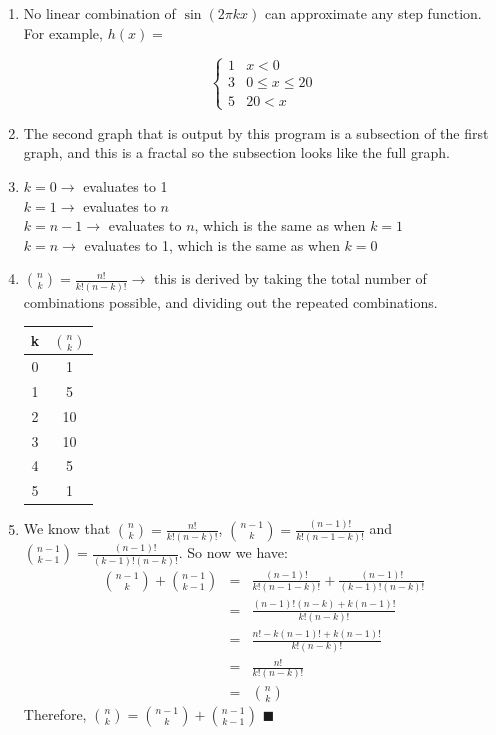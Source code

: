 \documentclass{article}
\newcommand*{\qed}{\hfill\ensuremath{\blacksquare}}
\begin{document}
\begin{enumerate}
\item No linear combination of $\sin{(2\pi kx)}$ can approximate any step function. For example, $h(x) = $

\[
\begin{cases} 
      1 & x< 0 \\
      3 & 0\leq x\leq 20 \\
      5 & 20< x 
\end{cases}
\]

\item The second graph that is output by this program is a subsection of the first graph, and this is a fractal so the subsection looks like the full graph.

\item $k=0 \rightarrow$ evaluates to 1\\
$k=1 \rightarrow$ evaluates to $n$\\
$k=n-1 \rightarrow$ evaluates to $n$, which is the same as when $k=1$\\
$k=n \rightarrow$ evaluates to 1, which is the same as when $k=0$

\item ${n\choose k} = \frac{n!}{k! (n-k)!} \rightarrow$ this is derived by taking the total number of combinations possible, and dividing out the repeated combinations.\\
\begin{tabular}{|c|c|}
	\hline
	k	& ${n\choose k}$\\
	\hline
	0	& 1\\
	\hline
	1	& 5\\
	\hline
	2	& 10\\
	\hline
	3	& 10\\
	\hline
	4	& 5\\
	\hline
	5	& 1\\
	\hline
\end{tabular}

\item We know that ${n\choose k} = \frac{n!}{k!(n-k)!}$, ${n-1\choose k} = \frac{(n-1)!}{k!(n-1-k)!}$ and ${n-1\choose k-1} = \frac{(n-1)!}{(k-1)!(n-k)!}$. So now we have:
\begin{eqnarray*}
	{n-1\choose k} + {n-1\choose k-1} &=& \frac{(n-1)!}{k!(n-1-k)!} + \frac{(n-1)!}{(k-1)!(n-k)!}\\
	&=& \frac{(n-1)!(n-k) + k(n-1)!}{k!(n-k)!}\\
	&=& \frac{n! - k(n-1)! + k(n-1)!}{k!(n-k)!}\\
	&=& \frac{n!}{k!(n-k)!}\\
	&=& {n\choose k} 
\end{eqnarray*} 
Therefore, ${n\choose k} = {n-1\choose k} + {n-1\choose k-1}$ \qed


\end{enumerate}
\end{document}
